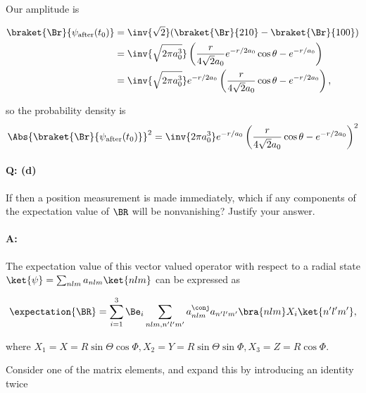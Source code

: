 Our amplitude is 

\begin{align*}
\braket{\Br}{\psi_{\text{after}}(t_0)}
&= \inv{\sqrt{2}} (\braket{\Br}{210} - \braket{\Br}{100}) \\
&= \inv{\sqrt{2 \pi a_0^3}}
\left(
\frac{r}{4\sqrt{2} a_0} e^{-r/2a_0} \cos\theta
-e^{-r/a_0}
\right) \\
&= \inv{\sqrt{2 \pi a_0^3}}
e^{-r/2 a_0} 
\left(
\frac{r}{4\sqrt{2} a_0} \cos\theta
-e^{-r/2 a_0}
\right),
\end{align*}

so the probability density is
\begin{equation}\label{eqn:qmIexamPractice2007Dec:4:300}
\Abs{\braket{\Br}{\psi_{\text{after}}(t_0)}}^2
= \inv{2 \pi a_0^3}
e^{-r/a_0} 
\left(
\frac{r}{4\sqrt{2} a_0} \cos\theta
-e^{-r/2 a_0}
\right)^2 
\end{equation}

\paragraph{Q: (d)}

If then a position measurement is made immediately, which if any components of the expectation value of $\BR$ will be nonvanishing?  Justify your answer.

\paragraph{A:}

The expectation value of this vector valued operator with respect to a radial state $\ket{\psi} = \sum_{nlm} a_{nlm} \ket{nlm}$ can be expressed as

\begin{equation}\label{eqn:qmIexamPractice2007Dec:4:400}
\expectation{\BR} = \sum_{i=1}^3 \Be_i \sum_{nlm, n'l'm'} 
a_{nlm}^\conj a_{n'l'm'} 
\bra{nlm} X_i
\ket{n'l'm'},
\end{equation}

where $X_1 = X = R \sin\Theta \cos\Phi, X_2 = Y = R \sin\Theta \sin\Phi, X_3 = Z = R \cos\Phi$.

Consider one of the matrix elements, and expand this by introducing an identity twice

